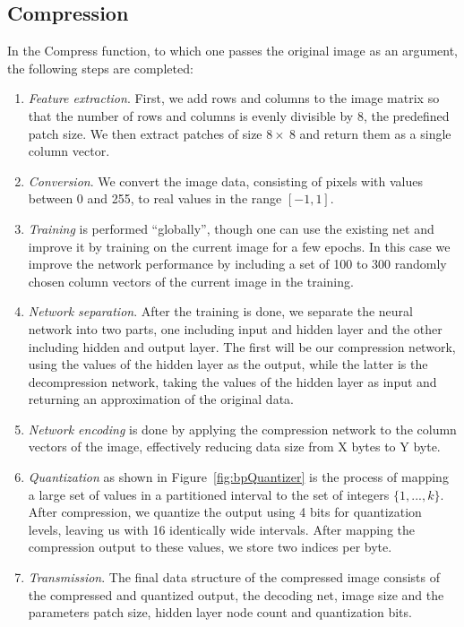 \subsection{Compression} \label{sec:compress}
In the Compress function, to which one passes the original image as an argument, the following steps are completed:
\begin{enumerate}
\item \emph{Feature extraction}. First, we add rows and columns to the image matrix so that the number of rows and columns is evenly divisible by 8, the predefined patch size. We then extract patches of size \(8 \times~8\) and return them as a single column vector.

\item \emph{Conversion}. We convert the image data, consisting of pixels with values between 0 and 255, to real values in the range \([-1, 1]\). 

\item \emph{Training} is performed ``globally'', though one can use the existing net and improve it by training on the current image for a few epochs. In this case we improve the network performance by including a set of 100 to 300 randomly chosen column vectors of the current image in the training.

\item \emph{Network separation}. After the training is done, we separate the neural network into two parts, one including input and hidden layer and the other including hidden and output layer. The first will be our compression network, using the values of the hidden layer as the output, while the latter is the decompression network, taking the values of the hidden layer as input and returning an approximation of the original data.

\item \emph{Network encoding} is done by applying the compression network to the column vectors of the image, effectively reducing data size from {\color{red} X bytes to Y byte}.

\item \emph{Quantization} as shown in Figure~\ref{fig:bpQuantizer} is the process of mapping a large set of values in a partitioned interval to the set of integers \(\{1,...,k\}\). After compression, we quantize the output using 4 bits for quantization levels, leaving us with 16 identically wide intervals. After mapping the compression output to these values, we store two indices per byte.

\item \emph{Transmission}. The final data structure of the compressed image consists of the compressed and quantized output, the decoding net, image size and the parameters patch size, hidden layer node count and quantization bits.
\end{enumerate}

